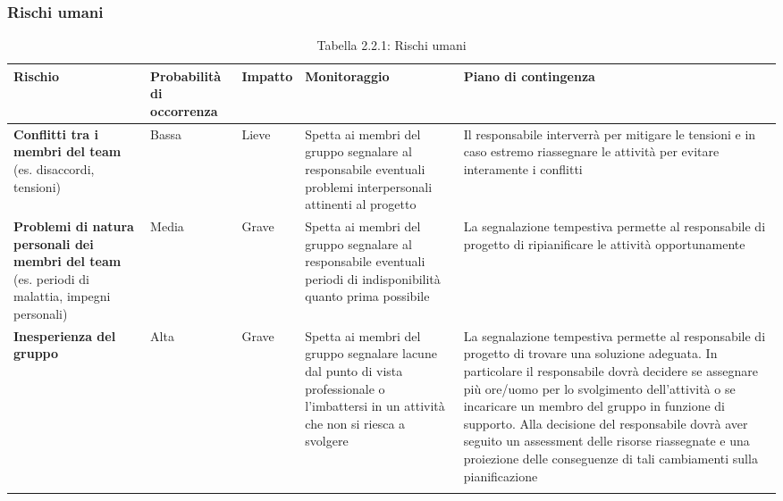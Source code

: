 	\subsubsection{Rischi umani}
\renewcommand{\arraystretch}{1.5}
\begin{longtable}{| m{8em} | m{6em} | m{4em} | m{9em} | m{9em} |}
\hline
\rowcolor{title_row}
\textbf{\color{title_text}Rischio} & \textbf{\color{title_text}Probabilità di occorrenza} & \textbf{\color{title_text}Impatto} & \textbf{\color{title_text}Monitoraggio} & \textbf{\color{title_text}Piano di contingenza} \\
\endhead

\hline \textbf{Conflitti tra i membri del team} (es. disaccordi, tensioni) & Bassa & Lieve &
	Spetta ai membri del gruppo segnalare al responsabile eventuali problemi interpersonali attinenti al progetto &
	Il responsabile interverrà per mitigare le tensioni e in caso estremo riassegnare le attività per evitare interamente i conflitti \\
\hline \textbf{Problemi di natura personali dei membri del team} (es. periodi di malattia, impegni personali) & Media & Grave &
	Spetta ai membri del gruppo segnalare al responsabile eventuali periodi di indisponibilità quanto prima possibile &
	La segnalazione tempestiva permette al responsabile di progetto di ripianificare le attività opportunamente \\
\hline \textbf{Inesperienza del gruppo} & Alta & Grave &
	Spetta ai membri del gruppo segnalare lacune dal punto di vista professionale o l'imbattersi in un attività che non si riesca a svolgere &
	La segnalazione tempestiva permette al responsabile di progetto di trovare una soluzione adeguata. In particolare il responsabile dovrà decidere se assegnare più ore/uomo per lo svolgimento dell'attività o se incaricare un membro del gruppo in funzione di supporto. Alla decisione del responsabile dovrà aver seguito un assessment delle risorse riassegnate e una proiezione delle conseguenze di tali cambiamenti sulla pianificazione \\
\hline
\caption{Tabella 2.2.1: Rischi umani\label{}}
\end{longtable}

\pagebreak
\renewcommand{\arraystretch}{1}
